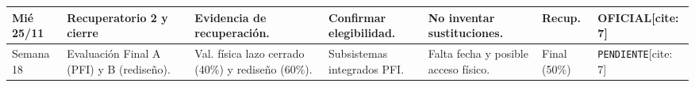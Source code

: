 \documentclass[10pt, a4paper, landscape]{article}
\begin{document}
\begin{table}[htbp]
\begin{tabularx}{\textwidth}{|P{1.6cm}|P{2.8cm}|P{3.0cm}|P{3.0cm}|P{2.6cm}|P{1.6cm}|Y|}
    \textbf{Mié 25/11} & \textbf{Recuperatorio 2 y cierre} & Evidencia de recuperación. & Confirmar elegibilidad. & No inventar sustituciones. & Recup. & \textbf{OFICIAL}[cite: 7] \\ \hline
    Semana 18 & Evaluación Final A (PFI) y B (rediseño). & Val. física lazo cerrado (40\%) y rediseño (60\%). & Subsistemas integrados PFI. & Falta fecha y posible acceso físico. & Final (50\%) & \texttt{PENDIENTE}[cite: 7] \\ \hline
    \end{tabularx}
\end{table}
\end{document}

